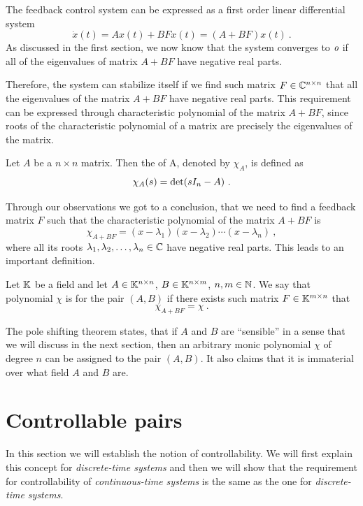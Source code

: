 The feedback control system can be expressed as a first order linear differential system $$\dot{x}(t)=Ax(t)+BFx(t)=(A+BF)x(t)\ .$$ As discussed in the first section, we now know that the system converges to $\textit{o}$ if all of the eigenvalues of matrix $A+BF$ have negative real parts. 

Therefore, the system can stabilize itself if we find such matrix $F \in \mathbb{C}^{n \times n}$ that all the eigenvalues of the matrix $A+BF$ have negative real parts. This requirement can be expressed through characteristic polynomial of the matrix $A+BF$, since roots of the characteristic polynomial of a matrix are precisely the eigenvalues of the matrix.

\begin{definition}
	Let $A$ be a $n\times n$ matrix. Then the  of A, denoted by $\chi_A$, is defined as $$\chi_A(s)=\textnormal{det}(sI_n-A)\ .$$
\end{definition}

Through our observations we got to a conclusion, that we need to find a feedback matrix $F$ such that the characteristic polynomial of the matrix $A+BF$ is $$\chi_{A+BF}=(x-\lambda_1)(x-\lambda_2)\cdots(x-\lambda_n)\ ,$$ where all its roots $\lambda_1,\lambda_2,\ldots,\lambda_n \in \mathbb{C}$ have negative real parts. This leads to an important definition.

\begin{definition}
    Let $\mathbb{K}$ be a field and let $A \in \mathbb{K}^{n \times n}$, $B \in \mathbb{K}^{n \times m}$, $n,m \in \mathbb{N}$. We say that polynomial $\chi$ is  for the pair $(A,B)$ if there exists such matrix $F\in\mathbb{K}^{m \times n}$ that $$\chi_{A+BF}=\chi\ .$$
\end{definition}

The pole shifting theorem states, that if $A$ and $B$ are ``sensible'' in a sense that we will discuss in the next section, then an arbitrary monic polynomial $\chi$ of degree $n$ can be assigned to the pair $(A,B)$. It also claims that it is immaterial over what field $A$ and $B$ are.

\section{Controllable pairs}

In this section we will establish the notion of controllability. We will first explain this concept for \textit{discrete-time systems} and then we will show that the requirement for controllability of \textit{continuous-time systems} is the same as the one for \textit{discrete-time systems}.

